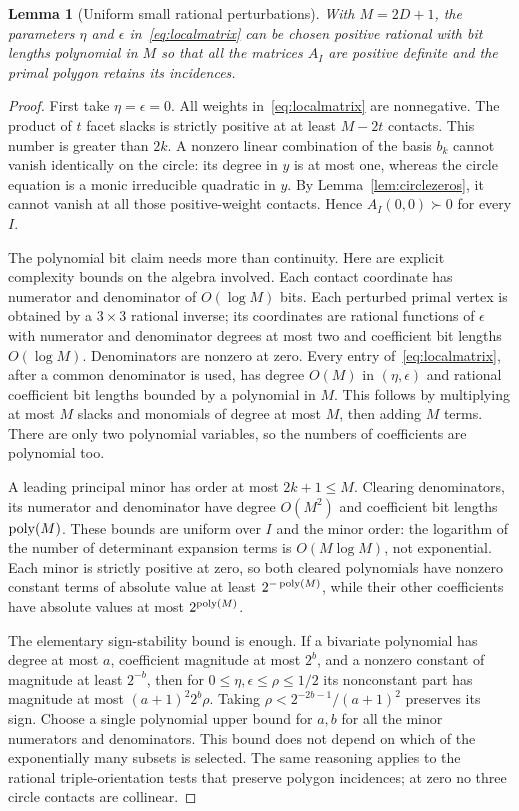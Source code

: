\documentclass[11pt]{article}
\newtheorem{lemma}[theorem]{Lemma}
\theoremstyle{definition}\newtheorem{definition}[theorem]{Definition}
\begin{document}
\begin{lemma}[Uniform small rational perturbations]
\label{lem:polyperturb}
With $M=2D+1$, the parameters $\eta$ and $\epsilon$ in~\eqref{eq:localmatrix} can be chosen positive rational with bit lengths polynomial in $M$ so that all the matrices $A_I$ are positive definite and the primal polygon retains its incidences.
\end{lemma}
\begin{proof}
First take $\eta=\epsilon=0$. All weights in~\eqref{eq:localmatrix} are nonnegative. The product of $t$ facet slacks is strictly positive at at least $M-2t$ contacts. This number is greater than $2k$. A nonzero linear combination of the basis $b_k$ cannot vanish identically on the circle: its degree in $y$ is at most one, whereas the circle equation is a monic irreducible quadratic in $y$. By Lemma~\ref{lem:circlezeros}, it cannot vanish at all those positive-weight contacts. Hence $A_I(0,0)\succ0$ for every $I$.

The polynomial bit claim needs more than continuity. Here are explicit complexity bounds on the algebra involved. Each contact coordinate has numerator and denominator of $O(\log M)$ bits. Each perturbed primal vertex is obtained by a $3\times3$ rational inverse; its coordinates are rational functions of $\epsilon$ with numerator and denominator degrees at most two and coefficient bit lengths $O(\log M)$. Denominators are nonzero at zero. Every entry of~\eqref{eq:localmatrix}, after a common denominator is used, has degree $O(M)$ in $(\eta,\epsilon)$ and rational coefficient bit lengths bounded by a polynomial in $M$. This follows by multiplying at most $M$ slacks and monomials of degree at most $M$, then adding $M$ terms. There are only two polynomial variables, so the numbers of coefficients are polynomial too.

A leading principal minor has order at most $2k+1\le M$. Clearing denominators, its numerator and denominator have degree $O(M^2)$ and coefficient bit lengths $\operatorname{poly}(M)$. These bounds are uniform over $I$ and the minor order: the logarithm of the number of determinant expansion terms is $O(M\log M)$, not exponential. Each minor is strictly positive at zero, so both cleared polynomials have nonzero constant terms of absolute value at least $2^{-\operatorname{poly}(M)}$, while their other coefficients have absolute values at most $2^{\operatorname{poly}(M)}$.

The elementary sign-stability bound is enough. If a bivariate polynomial has degree at most $a$, coefficient magnitude at most $2^b$, and a nonzero constant of magnitude at least $2^{-b}$, then for $0\le\eta,\epsilon\le\rho\le1/2$ its nonconstant part has magnitude at most $(a+1)^2 2^b\rho$. Taking $\rho<2^{-2b-1}/(a+1)^2$ preserves its sign. Choose a single polynomial upper bound for $a,b$ for all the minor numerators and denominators. This bound does not depend on which of the exponentially many subsets is selected. The same reasoning applies to the rational triple-orientation tests that preserve polygon incidences; at zero no three circle contacts are collinear.


\end{proof}
\end{document}
